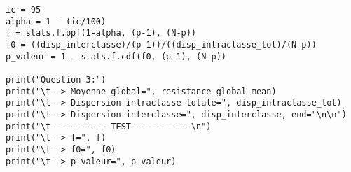 \begin{lstlisting}[style=myPython, caption=Code Python complet TP6, frame=lines]
ic = 95
alpha = 1 - (ic/100)
f = stats.f.ppf(1-alpha, (p-1), (N-p))
f0 = ((disp_interclasse)/(p-1))/((disp_intraclasse_tot)/(N-p))
p_valeur = 1 - stats.f.cdf(f0, (p-1), (N-p))

print("Question 3:")
print("\t--> Moyenne global=", resistance_global_mean)
print("\t--> Dispersion intraclasse totale=", disp_intraclasse_tot)
print("\t--> Dispersion interclasse=", disp_interclasse, end="\n\n")
print("\t----------- TEST -----------\n")
print("\t--> f=", f)
print("\t--> f0=", f0)
print("\t--> p-valeur=", p_valeur)    
\end{lstlisting}

